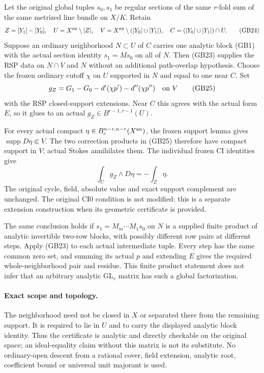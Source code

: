 Let the original global tuples $s_0,s_1$ be regular sections of
the same $r$-fold sum of the same metrized line bundle on $X/K$.
Retain
\[
 Z=[Y_1]-[Y_0],\quad U=X^{\rm an}\setminus|Z|,\quad
 V=X^{\rm an}\setminus(|Y_0|\cup|Y_1|),\quad
 C=(|Y_0|\cup|Y_1|)\cap U.
 \tag{GB24}
\]
Suppose an ordinary neighborhood $N\subset U$ of $C$ carries
one analytic block (GB1) with the actual section identity
$s_1=Ms_0$ on all of $N$.  Then (GB23) supplies the RSP data
on $N\cap V$ and $N$ without an additional path-overlap hypothesis.
Choose the frozen ordinary cutoff $\chi$ on $U$ supported in
$N$ and equal to one near $C$.  Set
\[
        g_Z=G_1-G_0-d'(\chi p')-d''(\chi p'')\quad\hbox{on }V
 \tag{GB25}
\]
with the RSP closed-support extensions.  Near $C$ this agrees
with the actual form $E$, so it glues to an actual
$g_Z\in B^{r-1,r-1}(U)$.

For every actual compact
$\eta\in B_c^{n-r,n-r}(X^{\rm an})$, the frozen support lemma
gives $\operatorname{supp}D\eta\Subset V$.  The two correction
products in (GB25) therefore have compact support in $V$;
actual Stokes annihilates them.  The individual frozen CI
identities give
\[
                    \int_Ug_Z\wedge D\eta=-\int_Z\eta.
 \tag{GB26}
\]
The original cycle, field, absolute value and exact support
complement are unchanged.  The original CI0 condition is not
modified: this is a separate extension construction when its
geometric certificate is provided.

The same conclusion holds if $s_1=M_m\cdots M_1s_0$ on $N$
is a supplied finite product of analytic invertible two-row
blocks, with possibly different row pairs at different steps.
Apply (GB23) to each actual intermediate tuple.  Every step
has the same common zero set, and summing its actual $p$ and
extending $E$ gives the required whole-neighborhood pair and
residue.  This finite product statement does not infer that
an arbitrary analytic $\mathrm{GL}_r$ matrix has such a global
factorization.

\paragraph{Exact scope and topology.}
The neighborhood need not be closed in $X$ or separated there
from the remaining support.  It is required to lie in $U$ and
to carry the displayed analytic block identity.  Thus the
certificate is analytic and directly checkable on the original
space; an ideal-equality claim without this matrix is not its
substitute.  No ordinary-open descent from a rational cover,
field extension, analytic root, coefficient bound or universal
unit majorant is used.

